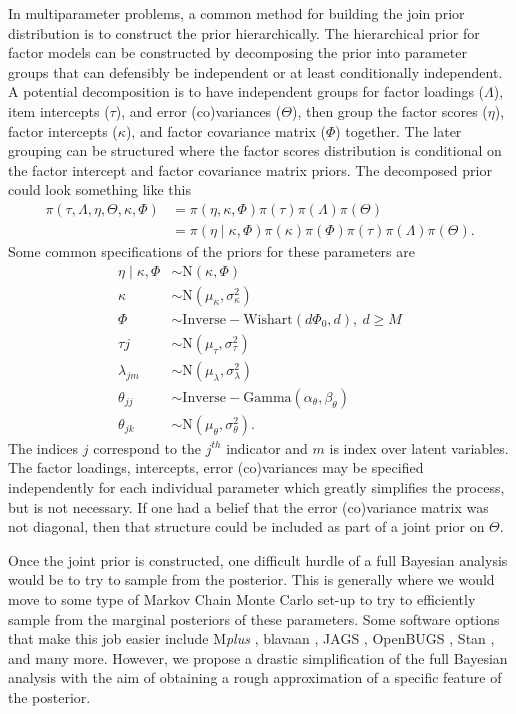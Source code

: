 \documentclass[noextraspace, floatsintext, 12pt]{apa7}
\begin{document}
In multiparameter problems, a common method for building the join prior distribution is to construct the prior hierarchically.
The hierarchical prior for factor models can be constructed by decomposing the prior into parameter groups that can defensibly be independent or at least conditionally independent.
A potential decomposition is to have independent groups for factor loadings ($\Lambda$), item intercepts ($\tau$), and error (co)variances ($\Theta$), then group the factor scores ($\eta$), factor intercepts ($\kappa$), and factor covariance matrix ($\Phi$) together.
The later grouping can be structured where the factor scores distribution is conditional on the factor intercept and factor covariance matrix priors.
The decomposed prior could look something like this
\begin{align*}
\pi\left(\tau, \Lambda, \eta,\Theta, \kappa, \Phi\right) &= \pi\left(\eta, \kappa, \Phi\right)\pi\left(\tau\right)\pi\left(\Lambda\right) \pi\left(\Theta\right)\\
&= \pi\left(\eta\mid \kappa, \Phi\right) \pi\left(\kappa\right)  \pi\left(\Phi\right) \pi\left(\tau\right)\pi\left(\Lambda\right) \pi\left(\Theta\right).
\end{align*}
Some common specifications of the priors for these parameters are
\begin{align*}
\eta\mid \kappa, \Phi &\sim \mathrm{N}(\kappa,\Phi)\\
\kappa &\sim \mathrm{N}(\mu_{\kappa}, \sigma^2_{\kappa})\\
\Phi &\sim \mathrm{Inverse-Wishart}(d\Phi_0, d),\ d \geq M\\
\tau{j} &\sim \mathrm{N}(\mu_{\tau}, \sigma^2_{\tau})\\
\lambda_{jm} &\sim \mathrm{N}(\mu_{\lambda}, \sigma^2_{\lambda})\\
\theta_{jj} &\sim \mathrm{Inverse-Gamma}(\alpha_{\theta}, \beta_{\theta})\\
\theta_{jk} &\sim \mathrm{N}(\mu_{\theta}, \sigma^2_{\theta}).
\end{align*}
The indices $j$ correspond to the $j^{th}$ indicator and $m$ is index over latent variables.
The factor loadings, intercepts, error (co)variances may be specified independently for each individual parameter which greatly simplifies the process, but is not necessary.
If one had a belief that the error (co)variance matrix was not diagonal, then that structure could be included as part of a joint prior on $\Theta$.

Once the joint prior is constructed, one difficult hurdle of a full Bayesian analysis would be to try to sample from the posterior.
This is generally where we would move to some type of Markov Chain Monte Carlo set-up to try to efficiently sample from the marginal posteriors of these parameters.
Some software options that make this job easier include M\textit{plus} \citep{Mplus}, blavaan \citep{blavaan}, JAGS \citep{jags}, OpenBUGS \citep{bugs}, Stan \citep{Stan}, and many more.
However, we propose a drastic simplification of the full Bayesian analysis with the aim of obtaining a rough approximation of a specific feature of the posterior.
\end{document}
